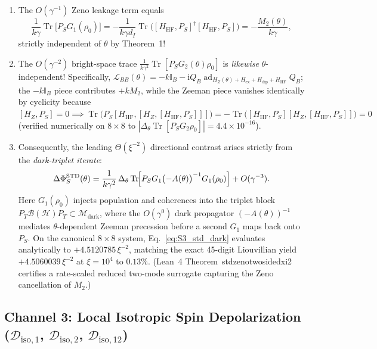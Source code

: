 \documentclass[onecolumn,10pt,notitlepage,amsmath,amssymb,floatfix]{revtex4-2}
\theoremstyle{plain}
\theoremstyle{definition}
\newcommand{\ii}{\mathrm{i}}
\newcommand{\Tr}{\operatorname{Tr}}
\newcommand{\ad}{\operatorname{ad}}
\newcommand{\PS}{P_S}
\newcommand{\PT}{P_T}
\newcommand{\HZ}{H_Z}
\newcommand{\HHF}{H_{\mathrm{HF}}}
\newcommand{\Hex}{H_{\mathrm{ex}}}
\newcommand{\Hdip}{H_{\mathrm{dip}}}
\newcommand{\DeltaPhi}{\Delta\Phi_S}
\newcommand{\leanid}[1]{{\footnotesize\ttfamily\def\_{\textunderscore\allowbreak}#1}}
\begin{document}
\begin{enumerate}[label=(\roman*),leftmargin=1.8em,itemsep=1pt]
\item The $O(\gamma^{-1})$ Zeno leakage term equals
\begin{equation}
\label{eq:S3_std_M2}
\frac{1}{k\gamma}\Tr\big[\PS G_1(\rho_0)\big] = -\frac{1}{k\gamma d_I}\Tr\big([\HHF, \PS]^\dagger [\HHF, \PS]\big) = -\frac{M_2(\theta)}{k\gamma},
\end{equation}
strictly independent of $\theta$ by Theorem~1!
\item The $O(\gamma^{-2})$ bright-space trace $\frac{1}{k\gamma^2}\Tr[\PS G_2(\theta)\rho_0]$ is \emph{likewise} $\theta$-independent! Specifically, $\mathcal{L}_{BB}(\theta) = -k\mathbb{I}_B - \ii Q_B\ad_{\HZ(\theta)+\Hex+\Hdip+\HHF}Q_B$; the $-k\mathbb{I}_B$ piece contributes $+k M_2$, while the Zeeman piece vanishes identically by cyclicity because $[\HZ,\PS]=0 \implies \Tr\bigl(\PS[\HHF,[\HZ,[\HHF,\PS]]]\bigr) = -\Tr\bigl([\HHF,\PS][\HZ,[\HHF,\PS]]\bigr) = 0$ (verified numerically on $8\times 8$ to $|\Delta_\theta \Tr[\PS G_2\rho_0]| = 4.4\times 10^{-16}$).
\item Consequently, the leading $\Theta(\xi^{-2})$ directional contrast arises strictly from the \emph{dark-triplet iterate}:
\begin{equation}
\label{eq:S3_std_dark}
\DeltaPhi^{\mathrm{STD}}(\theta) = \frac{1}{k\gamma^2}\,\Delta_\theta\Tr\!\Bigl[\PS G_1 \bigl(-A(\theta)\bigr)^{-1} G_1(\rho_0)\Bigr] + O(\gamma^{-3}).
\end{equation}
Here $G_1(\rho_0)$ injects population and coherences into the triplet block $\PT\mathcal{B}(\mathcal{H})\PT \subset \mathcal{M}_{\mathrm{dark}}$, where the $O(\gamma^0)$ dark propagator $(-A(\theta))^{-1}$ mediates $\theta$-dependent Zeeman precession before a second $G_1$ maps back onto $\PS$. On the canonical $8\times 8$ system, Eq.~\eqref{eq:S3_std_dark} evaluates analytically to $+4.5120785\,\xi^{-2}$, matching the exact 45-digit Liouvillian yield $+4.5060039\,\xi^{-2}$ at $\xi = 10^4$ to $0.13\%$. (Lean~4 Theorem~\leanid{std\_zeno\_two\_sided\_xi2} certifies a rate-scaled reduced two-mode surrogate capturing the Zeno cancellation of $M_2$.)
\end{enumerate}

\subsection{Channel 3: Local Isotropic Spin Depolarization (\texorpdfstring{$\mathcal{D}_{\mathrm{iso},1}$}{D\_iso,1}, \texorpdfstring{$\mathcal{D}_{\mathrm{iso},2}$}{D\_iso,2}, \texorpdfstring{$\mathcal{D}_{\mathrm{iso},12}$}{D\_iso,12})}
\end{document}
